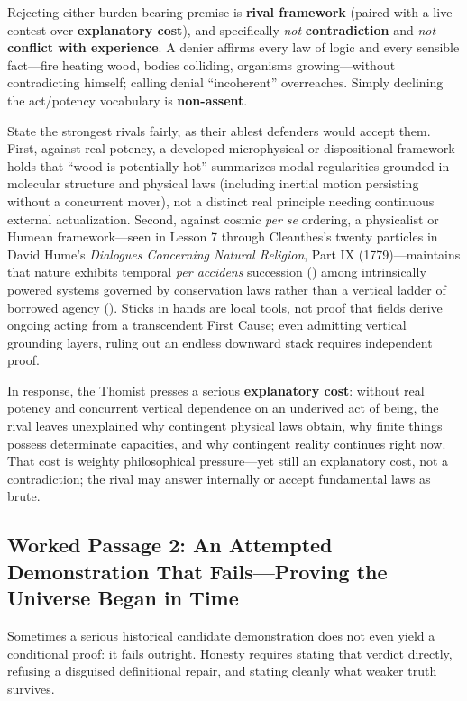 Rejecting either burden-bearing premise is \textbf{rival framework} (paired with a live contest over \textbf{explanatory cost}), and specifically \emph{not} \textbf{contradiction} and \emph{not} \textbf{conflict with experience}. A denier affirms every law of logic and every sensible fact---fire heating wood, bodies colliding, organisms growing---without contradicting himself; calling denial ``incoherent'' overreaches. Simply declining the act/potency vocabulary is \textbf{non-assent}.

State the strongest rivals fairly, as their ablest defenders would accept them. First, against real potency, a developed microphysical or dispositional framework holds that ``wood is potentially hot'' summarizes modal regularities grounded in molecular structure and physical laws (including inertial motion persisting without a concurrent mover), not a distinct real principle needing continuous external actualization. Second, against cosmic \emph{per se} ordering, a physicalist or Humean framework---seen in Lesson 7 through Cleanthes's twenty particles in David Hume's \emph{Dialogues Concerning Natural Religion}, Part IX (1779)---maintains that nature exhibits temporal \emph{per accidens} succession () among intrinsically powered systems governed by conservation laws rather than a vertical ladder of borrowed agency (). Sticks in hands are local tools, not proof that fields derive ongoing acting from a transcendent First Cause; even admitting vertical grounding layers, ruling out an endless downward stack requires independent proof.

In response, the Thomist presses a serious \textbf{explanatory cost}: without real potency and concurrent vertical dependence on an underived act of being, the rival leaves unexplained why contingent physical laws obtain, why finite things possess determinate capacities, and why contingent reality continues right now. That cost is weighty philosophical pressure---yet still an explanatory cost, not a contradiction; the rival may answer internally or accept fundamental laws as brute.

\subsection{Worked Passage 2: An Attempted Demonstration That Fails---Proving the Universe Began in Time}

Sometimes a serious historical candidate demonstration does not even yield a conditional proof: it fails outright. Honesty requires stating that verdict directly, refusing a disguised definitional repair, and stating cleanly what weaker truth survives.

